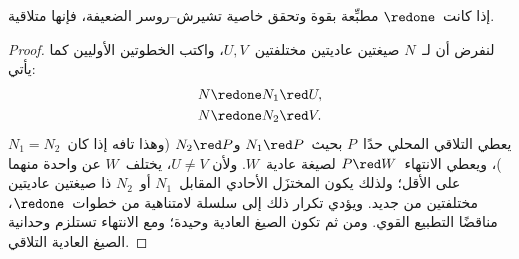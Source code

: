 \documentclass[../../../include/open-logic-section]{subfiles}
\begin{document}
\begin{lem}
إذا كانت~$\redone$ مطبِّعة بقوة وتحقق خاصية تشيرش--روسر الضعيفة، فإنها
متلاقية.
\end{lem}

\begin{proof}
  لنفرض أن لـ~$N$ صيغتين عاديتين مختلفتين~$U,V$، واكتب الخطوتين الأوليين
  كما يأتي:
  \begin{align*}
    N &\redone N_1\red U,\\
    N &\redone N_2\red V.
  \end{align*}
  يعطي التلاقي المحلي حدًا~$P$ بحيث~$N_1\red P$ و$N_2\red P$ (وهذا تافه
  إذا كان~$N_1=N_2$)، ويعطي الانتهاء~$P\red W$ لصيغة عادية~$W$. ولأن
  $U\ne V$، يختلف~$W$ عن واحدة منهما على الأقل؛ ولذلك يكون المختزَل الأحادي
  المقابل~$N_1$ أو~$N_2$ ذا صيغتين عاديتين مختلفتين من جديد. ويؤدي تكرار
  ذلك إلى سلسلة لامتناهية من خطوات~$\redone$، مناقضًا التطبيع القوي. ومن ثم
  تكون الصيغ العادية وحيدة؛ ومع الانتهاء تستلزم وحدانية الصيغ العادية
  التلاقي.
\end{proof}
\end{document}
